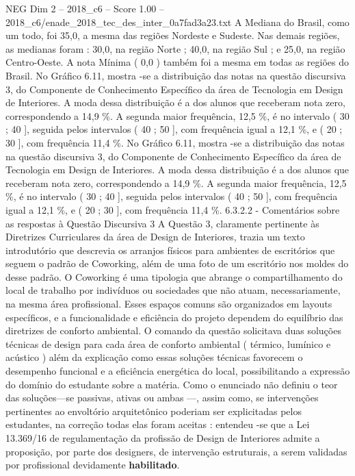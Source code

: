 \begin{textsample}{NEG Dim 2 – 2018\_c6 – Score 1.00 – 2018\_c6/enade\_2018\_tec\_des\_inter\_0a7fad3a23.txt}
A Mediana do Brasil, como um todo, foi 35,0, a mesma das regiões Nordeste e Sudeste.
Nas demais regiões, as medianas foram : 30,0, na região Norte ; 40,0, na região Sul ; e 25,0, na região Centro-Oeste.
A nota Mínima ( 0,0 ) também foi a mesma em todas as regiões do Brasil.
No Gráfico 6.11, mostra -se a distribuição das notas na questão discursiva 3, do Componente de Conhecimento Específico da área de Tecnologia em Design de Interiores.
A moda dessa distribuição é a dos alunos que receberam nota zero, correspondendo a 14,9 \%.
A segunda maior frequência, 12,5 \%, é no intervalo ( 30 ; 40 ], seguida pelos intervalos ( 40 ; 50 ], com frequência igual a 12,1 \%, e ( 20 ; 30 ], com frequência 11,4 \%.
No Gráfico 6.11, mostra -se a distribuição das notas na questão discursiva 3, do Componente de Conhecimento Específico da área de Tecnologia em Design de Interiores.
A moda dessa distribuição é a dos alunos que receberam nota zero, correspondendo a 14,9 \%.
A segunda maior frequência, 12,5 \%, é no intervalo ( 30 ; 40 ], seguida pelos intervalos ( 40 ; 50 ], com frequência igual a 12,1 \%, e ( 20 ; 30 ], com frequência 11,4 \%. 6.3.2.2 - Comentários sobre as respostas à Questão Discursiva 3 A Questão 3, claramente pertinente às Diretrizes Curriculares da área de Design de Interiores, trazia um texto introdutório que descrevia os arranjos físicos para ambientes de escritórios que seguem o padrão de Coworking, além de uma foto de um escritório nos moldes do desse padrão.
O Coworking é uma tipologia que abrange o compartilhamento do local de trabalho por indivíduos ou sociedades que não atuam, necessariamente, na mesma área profissional.
Esses espaços comuns são organizados em layouts específicos, e a funcionalidade e eficiência do projeto dependem do equilíbrio das diretrizes de conforto ambiental.
O comando da questão solicitava duas soluções técnicas de design para cada área de conforto ambiental ( térmico, lumínico e acústico ) além da explicação como essas soluções técnicas favorecem o desempenho funcional e a eficiência energética do local, possibilitando a expressão do domínio do estudante sobre a matéria.
Como o enunciado não definiu o teor das soluções—se passivas, ativas ou ambas —, assim como, se intervenções pertinentes ao envoltório arquitetônico poderiam ser explicitadas pelos estudantes, na correção todas elas foram aceitas : entendeu -se que a Lei 13.369/16 de regulamentação da profissão de Design de Interiores admite a proposição, por parte dos designers, de intervenção estruturais, a serem validadas por profissional devidamente \textbf{habilitado}.

\end{textsample}
